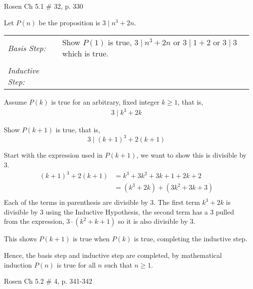 \documentclass[12pt,addpoints]{exam}
\begin{document}
\begin{questions}
\question[8] Rosen Ch 5.1 \# 32, p. 330
    \ifprintanswers
        \vspace{-10pt}
   \fi
\begin{solution}
Let $P(n)$ be the proposition is $3 \;|\; n^3 + 2n$.

\smallskip
\begin{tabular}{ll}
  \textit{Basis Step:} & Show $P(1)$ is true, $3 \;|\; n^3 + 2n$ or $3 \;|\; 1 + 2$ or $3 \;|\; 3$ which is true. \\
   & \\
 \textit{Inductive Step:} &  \\
\end{tabular}

Assume $P(k)$ is true for an arbitrary, fixed
 integer $k \geq 1$, that is,
\begin{align*}
	3 \;|\; k^3 + 2k \tag{IH} 
\end{align*}

Show $P(k+1)$ is true, that is,
\[ 3 \;|\; (k+1)^3 + 2(k+1) \]

Start with the expression used in $P(k+1)$, we want to show this is divisible by 3.
\begin{align*}
	(k+1)^3 + 2(k+1) &=  k^3 + 3k^2 + 3k + 1 + 2k + 2 \\
	 &= (k^3 + 2k) + (3k^2 + 3k + 3) \\
\end{align*}
Each of the terms in parenthesis are divisible by 3.  The first term $k^3 + 2k$ is divisible by 3 using the Inductive Hypothesis, the second term has a 3 pulled from the expression, $3\cdot(k^2 + k + 1)$ so it is also divisible by 3. 

This shows $P(k+1)$ is true when $P(k)$ is true, completing the
inductive step.

\smallskip
Hence, the basis step and inductive step are completed, by mathematical induction $P(n)$ is true for all $n$ such
that $n\geq 1$.
\end{solution}



\question[9] Rosen Ch 5.2 \# 4, p. 341-342
    \ifprintanswers
        \vspace{-10pt}
   \fi
\begin{solution}
\end{solution}
\end{questions}
\end{document}
